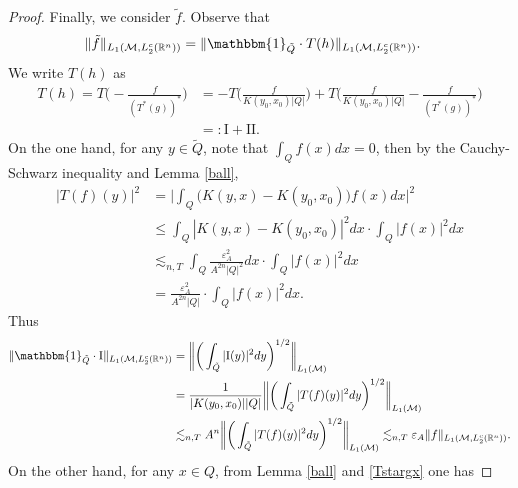 \documentclass[oneside,english,a4wide]{amsart}
\numberwithin{equation}{section}
\numberwithin{figure}{section}
\theoremstyle{plain}
\theoremstyle{plain}
\theoremstyle{definition}
\theoremstyle{plain}
\theoremstyle{remark}
\theoremstyle{definition}
\theoremstyle{remark}
\theoremstyle{definition}
\newcommand{\8}{\infty}
\begin{document}
\begin{proof}
	Finally, we consider $\tilde{f}$. Observe that 
	\begin{equation*}
		\begin{aligned}
			\|\tilde{f}\|_{L_1(\mathcal{M},L_2^c(\mathbb{R}^n))}{}&= 	\|\mathbbm{1}_{\tilde{Q}}\cdot T(h)\|_{L_1(\mathcal{M},L_2^c(\mathbb{R}^n))}.
		\end{aligned}
	\end{equation*}
   We write $T(h)$ as
    \begin{equation*}
    	\begin{aligned}
    		T(h)=T\biggl(-\frac{f}{(T^*(g))^*}\biggr){}&=-T\biggl(\frac{f}{{K(y_0,x_0)}|Q|}\biggr)+T\biggl(\frac{f}{{K(y_0,x_0)}|Q|}-\frac{f}{(T^*(g))^*}\biggr)\\
    		&=:\mathrm{I}+\mathrm{II}.
    	\end{aligned}
    \end{equation*}
    On the one hand, for any $y\in\tilde{Q}$, note that $\int_Q f(x)dx=0$, then by the Cauchy-Schwarz inequality and Lemma \ref{ball},
    \begin{equation*}
    	\begin{aligned}
    		|T(f)(y)|^2{}&=\bigg|\int_{Q} \big(K(y,x)-K(y_0,x_0)\big)f(x)dx\bigg|^2\\
    		&\le \int_{Q} |K(y,x)-K(y_0,x_0)|^2dx \cdot \int_{Q} |f(x)|^2dx\\
    		&\lesssim_{n,T} \int_{Q} \frac{\varepsilon_A^2}{A^{2n}|Q|^2}dx \cdot \int_{Q} |f(x)|^2dx\\
    		&=\frac{\varepsilon_A^2}{A^{2n}|Q|} \cdot \int_{Q} |f(x)|^2dx.
    	\end{aligned}
    \end{equation*}
    Thus
    \begin{equation}\label{Ibou}
    	\begin{aligned}
    		\|\mathbbm{1}_{\tilde{Q}}\cdot\mathrm{I}\|_{L_1(\mathcal{M},L_2^c(\mathbb{R}^n))}{}&=\bigg\|\bigg(\int_{\tilde{Q}} |\mathrm{I}(y)|^2dy\bigg)^{1/2}\bigg\|_{L_1(\mathcal{M})}\\
    		&=\frac{1}{|K(y_0,x_0)||Q|} \bigg\|\bigg(\int_{\tilde{Q}} |T(f)(y)|^2dy\bigg)^{1/2}\bigg\|_{L_1(\mathcal{M})}\\
    		&\lesssim_{n,T} A^n \bigg\|\bigg(\int_{\tilde{Q}} |T(f)(y)|^2dy\bigg)^{1/2}\bigg\|_{L_1(\mathcal{M})}
    		\lesssim_{n,T} \varepsilon_A \|f\|_{L_1(\mathcal{M},L_2^c(\mathbb{R}^n))}.
    	\end{aligned}
    \end{equation}
    On the other hand, for any $x\in Q$, from Lemma \ref{ball} and \eqref{Tstargx} one has

\end{proof}
\end{document}
